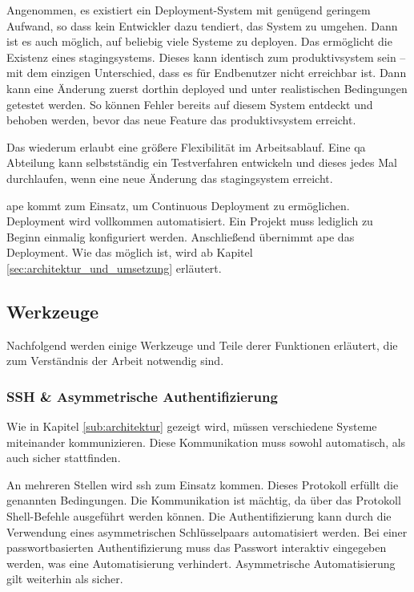 Angenommen, es existiert ein Deployment-System mit genügend geringem Aufwand, so dass kein Entwickler dazu tendiert, das System zu umgehen. Dann ist es auch möglich, auf beliebig viele Systeme zu deployen. Das ermöglicht die Existenz eines \glspl{stagingsystem}. Dieses kann identisch zum \gls{produktivsystem} sein -- mit dem einzigen Unterschied, dass es für Endbenutzer nicht erreichbar ist. Dann kann eine Änderung zuerst dorthin deployed und unter realistischen Bedingungen getestet werden. So können Fehler bereits auf diesem System entdeckt und behoben werden, bevor das neue Feature das \gls{produktivsystem} erreicht.

Das wiederum erlaubt eine größere Flexibilität im Arbeitsablauf. Eine \gls{qa} Abteilung kann selbstständig ein Testverfahren entwickeln und dieses jedes Mal durchlaufen, wenn eine neue Änderung das \gls{stagingsystem} erreicht.

\gls{ape} kommt zum Einsatz, um Continuous Deployment zu ermöglichen. Deployment wird vollkommen automatisiert. Ein Projekt muss lediglich zu Beginn einmalig konfiguriert werden. Anschließend übernimmt \gls{ape} das Deployment. Wie das möglich ist, wird ab Kapitel \ref{sec:architektur_und_umsetzung} erläutert.



\subsection{Werkzeuge} %
\label{sub:werkzeuge}

Nachfolgend werden einige Werkzeuge und Teile derer Funktionen erläutert, die zum Verständnis der Arbeit notwendig sind.

\subsubsection{SSH \& Asymmetrische Authentifizierung} %
\label{ssub:ssh_&_asymmetrische_authentifizierung}

Wie in Kapitel \ref{sub:architektur} gezeigt wird, müssen verschiedene Systeme miteinander kommunizieren. Diese Kommunikation muss sowohl automatisch, als auch sicher stattfinden.

An mehreren Stellen wird \gls{ssh} zum Einsatz kommen. Dieses Protokoll erfüllt die genannten Bedingungen. Die Kommunikation ist mächtig, da über das Protokoll Shell-Befehle ausgeführt werden können. Die Authentifizierung kann durch die Verwendung eines asymmetrischen Schlüsselpaars automatisiert werden. Bei einer passwortbasierten Authentifizierung muss das Passwort interaktiv eingegeben werden, was eine Automatisierung verhindert. Asymmetrische Automatisierung gilt weiterhin als sicher.

